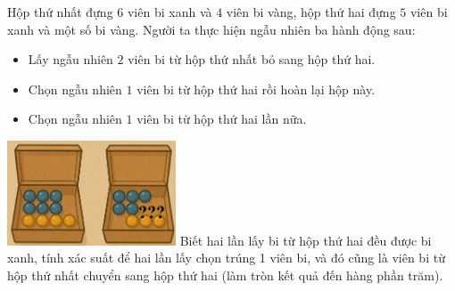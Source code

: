 \begin{ex}%
\immini
{
    Hộp thứ nhất đựng $6$ viên bi xanh và $4$ viên bi vàng, hộp thứ hai đựng $5$ viên bi xanh và một số bi vàng. Người ta thực hiện ngẫu nhiên ba hành động sau:
\begin{itemize}
    \item Lấy ngẫu nhiên $2$ viên bi từ hộp thứ nhất bỏ sang hộp thứ hai.
    \item Chọn ngẫu nhiên $1$ viên bi từ hộp thứ hai rồi hoàn lại hộp này.
    \item Chọn ngẫu nhiên $1$ viên bi từ hộp thứ hai lần nữa.
\end{itemize}
}
{
    \includegraphics[width=5cm]{img/HXN-11-21}
}
Biết hai lần lấy bi từ hộp thứ hai đều được bi xanh, tính xác suất để hai lần lấy chọn trúng 1 viên bi, và đó cũng là viên bi từ hộp thứ nhất chuyển sang hộp thứ hai (làm tròn kết quả đến hàng phần trăm).
\end{ex}
